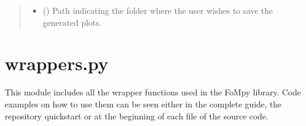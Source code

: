 \documentclass[letterpaper,10pt,english,openany, oneside]{sphinxmanual}
\begin{document}
\begin{fulllineitems}
\begin{fulllineitems}
\begin{quote}
\begin{description}
\begin{itemize}
\item {} 
 (\sphinxstyleliteralemphasis{\sphinxupquote{, }}) \textendash{} Path indicating the folder where the user wishes to save the generated plots.

\end{itemize}

\end{description}\end{quote}

\end{fulllineitems}


\end{fulllineitems}

\label{\detokenize{index:module-fompy.wrappers}}

\section{wrappers.py}
\label{\detokenize{index:wrappers-py}}
This module includes all the wrapper functions used in the FoMpy library.
Code examples on how to use them can be seen either in the complete guide, the repository quickstart
or at the beginning of each file of the source code.
\end{document}

